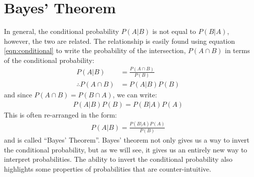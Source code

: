 \section{Bayes' Theorem}
In general, the conditional probability $P(A|B)$ is not equal to $P(B|A)$, however, the two are related. The relationship is easily found using equation \ref{eqn:conditional} to write the probability of the intersection, $P(A \cap B)$ in terms of the conditional probability:
\begin{align}
P(A|B) &= \frac{P(A \cap B)}{P(B)}\nonumber\\
\therefore P(A \cap B) &= P(A|B)P(B)
\end{align}
and since $P(A\cap B) = P(B\cap A)$, we can write:
\begin{align}
P(A|B)P(B) = P(B|A)P(A)
\end{align}
This is often re-arranged in the form:
\begin{align}
\label{eqn:Bayes}
P(A|B) = \frac{P(B|A)P(A)}{P(B)}
\end{align}
and is called ``Bayes' Theorem''. Bayes' theorem not only gives us a way to invert the conditional probability, but as we will see, it gives us an entirely new way to interpret probabilities. The ability to invert the conditional probability also highlights some properties of probabilities that are counter-intuitive. 

